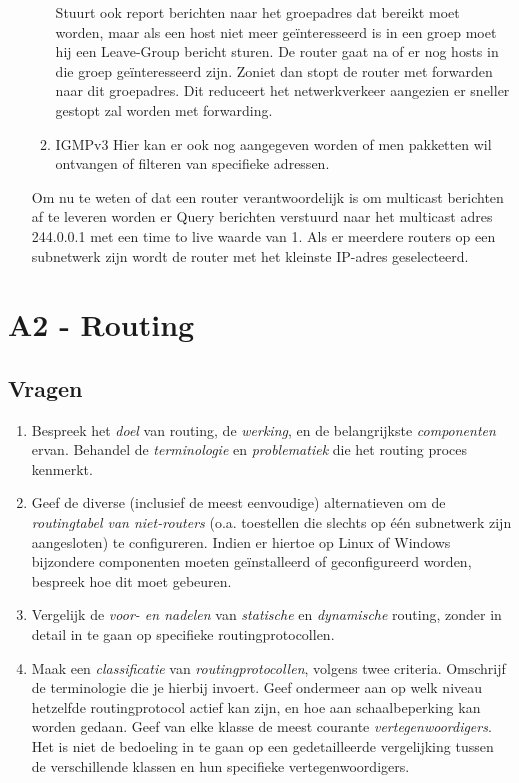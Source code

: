 \documentclass{report}
\begin{document}
\begin{enumerate}
\begin{enumerate}
		\newline
		Stuurt ook report berichten naar het groepadres dat bereikt moet worden, maar als een host niet meer geïnteresseerd is in een groep moet hij een Leave-Group bericht sturen. De router gaat na of er nog hosts in die groep geïnteresseerd zijn. Zoniet dan stopt de router met forwarden naar dit groepadres. Dit reduceert het netwerkverkeer aangezien er sneller gestopt zal worden met forwarding.
		\item IGMPv3
		Hier kan er ook nog aangegeven worden of men pakketten wil ontvangen of filteren van specifieke adressen.
	\end{enumerate}
	Om nu te weten of dat een router verantwoordelijk is om multicast berichten af te leveren worden er Query berichten verstuurd naar het multicast adres 244.0.0.1 met een time to live waarde van 1. Als er meerdere routers op een subnetwerk zijn wordt de router met het kleinste IP-adres geselecteerd.
\end{enumerate}



\newpage




\newpage
\section{A2 - Routing}
\subsection{Vragen}
\begin{enumerate}
	\item Bespreek het \textit{doel} van routing, de \textit{werking}, en de belangrijkste \textit{componenten} ervan. Behandel de \textit{terminologie} en \textit{problematiek} die het routing proces kenmerkt.
	\item Geef de diverse (inclusief de meest eenvoudige) alternatieven om de \textit{routingtabel van niet-routers} (o.a. toestellen die slechts op één subnetwerk zijn aangesloten) te configureren. Indien er hiertoe op Linux of Windows bijzondere componenten moeten geïnstalleerd of geconfigureerd worden, bespreek hoe dit moet gebeuren.
	\item Vergelijk de \textit{voor- en nadelen} van \textit{statische} en \textit{dynamische} routing, zonder in detail in te gaan op specifieke routingprotocollen.
	\item Maak een \textit{classificatie} van \textit{routingprotocollen}, volgens twee criteria. Omschrijf de terminologie die je hierbij invoert. Geef ondermeer aan op welk niveau hetzelfde routingprotocol actief kan zijn, en hoe aan schaalbeperking kan worden gedaan. Geef van elke klasse de meest courante \textit{vertegenwoordigers}. Het is niet de bedoeling in te gaan op een gedetailleerde vergelijking tussen de verschillende klassen en hun specifieke vertegenwoordigers.
\end{enumerate}
\end{document}
